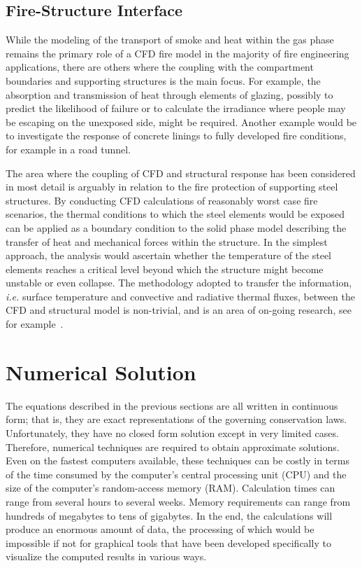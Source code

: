 \documentclass[graybox]{svmult}
\begin{document}
\subsection{Fire-Structure Interface}

While the modeling of the transport of smoke and heat within the gas phase remains the primary role of a CFD fire model in the majority of fire engineering applications, there are others where the coupling with the compartment boundaries and supporting structures is the main focus. For example, the absorption and transmission of heat through elements of glazing, possibly to predict the likelihood of failure or to calculate the irradiance where people may be escaping on the unexposed side, might be required. Another example would be to investigate the response of concrete linings to fully developed fire conditions, for example in a road tunnel.

The area where the coupling of CFD and structural response has been considered in most detail is arguably in relation to the fire protection of supporting steel structures. By conducting CFD calculations of reasonably worst case fire scenarios, the thermal conditions to which the steel elements would be exposed can be applied as a boundary condition to the solid phase model describing the transfer of heat and mechanical forces within the structure. In the simplest approach, the analysis would ascertain whether the temperature of the steel elements reaches a critical level beyond which the structure might become unstable or even collapse. The methodology adopted to transfer the information, {\em i.e.} surface temperature and convective and radiative thermal fluxes, between the CFD and structural model is non-trivial, and is an area of on-going research, see for example~\cite{Welch}.


\section{Numerical Solution}

The  equations  described  in  the  previous  sections are all written in continuous form; that is, they are exact representations of the governing conservation laws. Unfortunately, they have no closed form solution except in very limited cases. Therefore, numerical techniques are required to obtain approximate solutions. Even on the fastest computers available, these techniques can be costly in terms of the time consumed by the computer's central processing unit (CPU) and the size of the computer's random-access memory (RAM). Calculation times can range from several hours to several weeks. Memory requirements can range from hundreds of megabytes to tens of gigabytes. In the end, the calculations will produce an enormous amount of data, the processing of which would be impossible if not for graphical tools that have been developed specifically to visualize the computed results in various ways.
\end{document}
